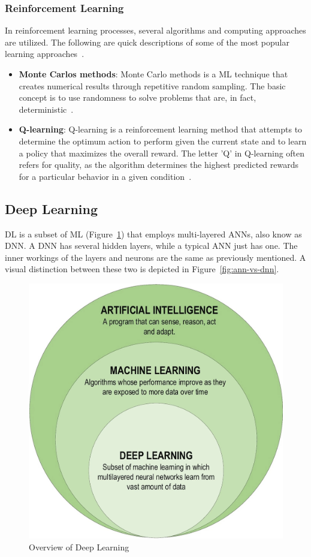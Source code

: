 \subsubsection{Reinforcement Learning}

In reinforcement learning processes, several algorithms and computing approaches are utilized. The following are quick descriptions of some of the most popular learning approaches~\cite{Sarker2021MachineDirections}.
\begin{itemize}
    \item \textbf{Monte Carlos methods}: Monte Carlo methods is a \gls{ML} technique that creates numerical results through repetitive random sampling. The basic concept is to use randomness to solve problems that are, in fact, deterministic~\cite{Sarker2021MachineDirections}.
    \item \textbf{Q-learning}: Q-learning is a reinforcement learning method that attempts to determine the optimum action to perform given the current state and to learn a policy that maximizes the overall reward. The letter 'Q' in Q-learning often refers for quality, as the algorithm determines the highest predicted rewards for a particular behavior in a given condition~\cite{Sarker2021MachineDirections}.
\end{itemize}

\subsection{Deep Learning}

\gls{DL} is a subset of \gls{ML} (Figure~\ref{fig:DL}) that employs multi-layered \gls{ANN}s, also know as \gls{DNN}. A \gls{DNN} has several hidden layers, while a typical \gls{ANN} just has one. The inner workings of the layers and neurons are the same as previously mentioned. A visual distinction between these two is depicted in Figure~\ref{fig:ann-vs-dnn}.

\begin{figure}[htbp]
    \centering
    \includegraphics[width=0.5\linewidth]{Chapters/Figures/DL.png}
    \caption{Overview of Deep Learning~\cite{Alzubaidi2021ReviewDirections}}
    \label{fig:DL}
\end{figure}

